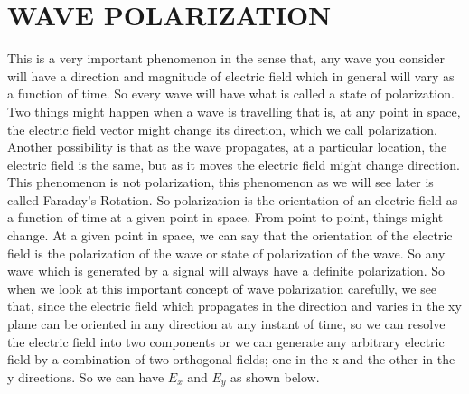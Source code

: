 \section{WAVE POLARIZATION}
This is a very important phenomenon in the sense that, any wave you consider will have a direction and magnitude of electric field which in general will vary as a function of time. So every wave will have what is called a state of polarization. Two things might happen when a wave is travelling that is, at any point in space, the electric field vector might change its direction, which we call polarization. Another possibility is that as the wave propagates, at a particular location, the electric field is the same, but as it moves the electric field might change direction. This phenomenon is not polarization, this phenomenon as we will see later is called Faraday's Rotation. So polarization is the orientation of an electric field as a function of time at a given point in space. From point to point, things might change. At a given point in space, we can say that the orientation of the electric field is the polarization of the wave or state of polarization of the wave. So any wave which is generated by a signal will always have a definite polarization. So when we look at this important concept of wave polarization carefully, we see that, since the electric field which propagates in the direction and varies in the xy plane can be oriented in any direction at any instant of time, so we can resolve the electric field into two components or we can generate any arbitrary electric field by a combination of two orthogonal fields; one in the x and the other in the y directions. So we can have $E_x$ and $E_y$ as shown below. 

